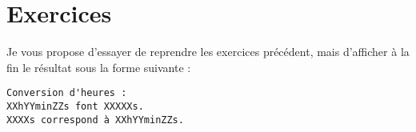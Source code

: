 \section*{Exercices}
{}
Je vous propose d'essayer de reprendre les exercices précédent, mais d'afficher à la fin le résultat sous la forme suivante :
\begin{verbatim}
Conversion d'heures :
XXhYYminZZs font XXXXXs.
XXXXs correspond à XXhYYminZZs.
\end{verbatim}

